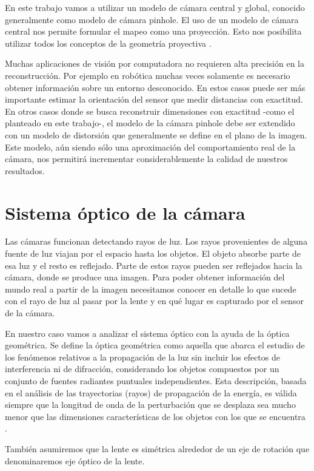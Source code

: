 En este trabajo vamos a utilizar un modelo de cámara central y global, conocido generalmente como modelo de cámara pinhole. El uso de un modelo de cámara central nos permite formular el mapeo como una proyección. Esto nos posibilita utilizar todos los conceptos de la geometría proyectiva \cite{hanning2011high}.

Muchas aplicaciones de visión por computadora no requieren alta precisión en la reconstrucción. Por ejemplo en robótica muchas veces solamente es necesario obtener información sobre un entorno desconocido. En estos casos puede ser más importante estimar la orientación del sensor que medir distancias con exactitud. En otros casos donde se busca reconstruir dimensiones con exactitud -como el planteado en este trabajo-, el modelo de la cámara pinhole debe ser extendido con un modelo de distorsión que generalmente se define en el plano de la imagen. Este modelo, aún siendo sólo una aproximación del comportamiento real de la cámara, nos permitirá incrementar considerablemente la calidad de nuestros resultados.

\section{Sistema óptico de la cámara}
Las cámaras funcionan detectando rayos de luz. Los rayos provenientes de alguna fuente de luz viajan por el espacio hasta los objetos. El objeto absorbe parte de esa luz y el resto es reflejado. Parte de estos rayos pueden ser reflejados hacia la cámara, donde se produce una imagen. Para poder obtener información del mundo real a partir de la imagen necesitamos conocer en detalle lo que sucede con el rayo de luz al pasar por la lente y en qué lugar es capturado por el sensor de la cámara.

En nuestro caso vamos a analizar el sistema óptico con la ayuda de la óptica geométrica. Se define la óptica geométrica como aquella que abarca el estudio de los fenómenos relativos a la propagación de la luz sin incluir los efectos de interferencia ni de difracción, considerando los objetos compuestos por un conjunto de fuentes radiantes puntuales independientes. Esta descripción, basada en el análisis de las trayectorias (rayos) de propagación de la energía, es válida siempre que la longitud de onda de la perturbación que se desplaza sea mucho menor que las dimensiones características de los objetos con los que se encuentra \cite{greivenkamp2004field}.

También asumiremos que la lente es simétrica alrededor de un eje de rotación que denominaremos eje óptico de la lente.

